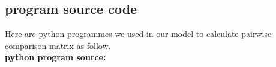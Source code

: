 \documentclass{mcmthesis}
\begin{document}
\newpage
\begin{appendices}
\section{program source code}
Here are python programmes we used in our model to calculate pairwise comparison matrix as follow.\\
\textbf{\textcolor[rgb]{0.98,0.00,0.00}{python program source:}}


\end{appendices}
\end{document}
